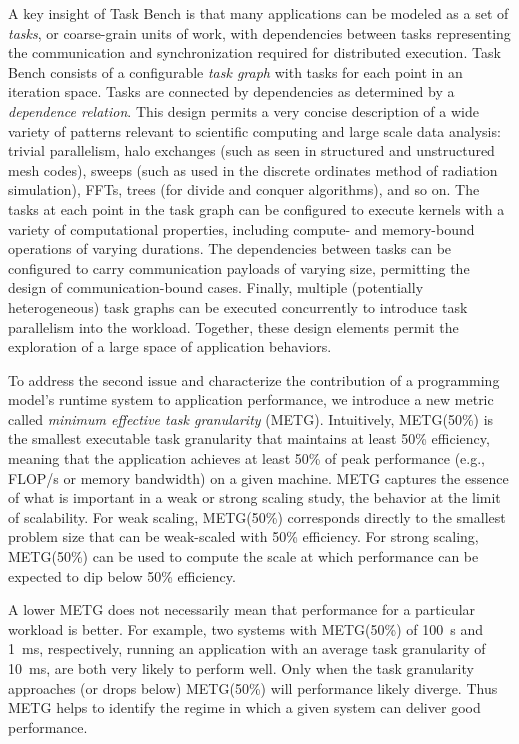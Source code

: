 A key insight of Task Bench is that many applications can be modeled
as a set of \emph{tasks}, or coarse-grain units of work, with
dependencies between tasks representing the communication and synchronization required for
distributed execution. Task Bench consists of a configurable \emph{task graph} with tasks for
each point in an iteration space. Tasks are connected by dependencies
as determined by a \emph{dependence relation}. This design permits a
very concise description of a wide variety of patterns relevant to
scientific computing and large scale data analysis: trivial parallelism, halo exchanges (such as
seen in structured and unstructured mesh codes), sweeps (such as used
in the discrete ordinates method of radiation simulation), FFTs, trees
(for divide and conquer algorithms), and so on. The tasks at each
point in the task graph can be configured to execute kernels with a
variety of computational properties, including compute- and
memory-bound operations of varying durations. The dependencies between
tasks can be configured to carry communication payloads of varying size, permitting
the design of communication-bound cases. Finally, multiple
(potentially heterogeneous) task graphs can be executed concurrently
to introduce task parallelism into the workload. Together, these
design elements permit the exploration of a large space of application
behaviors.

To address the second issue and characterize the contribution of a programming model's runtime system to application performance, we introduce a new metric called \emph{minimum effective task granularity} (METG). Intuitively, METG(50\%) is the smallest executable task granularity that maintains at least 50\% efficiency, meaning that the application achieves at least 50\% of peak
performance (e.g., FLOP/s or memory bandwidth) on a given machine. METG captures the essence of what is important in a weak
or strong scaling study, the behavior at the limit of scalability. For
weak scaling, METG(50\%) corresponds directly to the smallest problem size that can be weak-scaled with 50\% efficiency. For strong scaling, METG(50\%) can be used to compute the scale at which performance can be expected to dip below 50\% efficiency.

A lower METG does not necessarily mean that performance for a particular workload is
better. For example, two systems with METG(50\%) of 100~\textmu{}s and 1~ms,
respectively, running an application with an average task granularity
of 10~ms, are both very likely to perform well. Only when the task
granularity approaches (or drops below) METG(50\%) will performance
likely diverge. Thus METG helps to identify the regime in which a
given system can deliver good performance.


